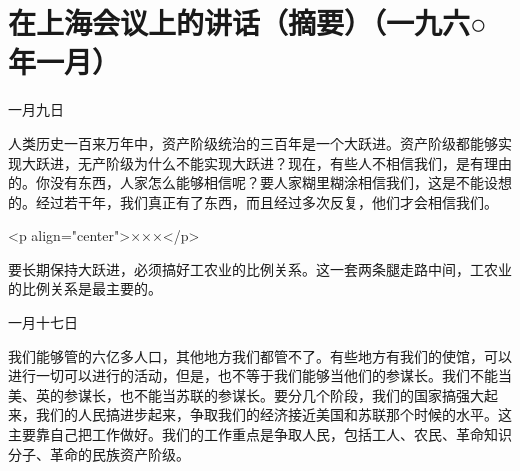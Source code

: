 \section[在上海会议上的讲话（摘要）（一九六○年一月）]{在上海会议上的讲话（摘要）（一九六○年一月）}


一月九日

人类历史一百来万年中，资产阶级统治的三百年是一个大跃进。资产阶级都能够实现大跃进，无产阶级为什么不能实现大跃进？现在，有些人不相信我们，是有理由的。你没有东西，人家怎么能够相信呢？要人家糊里糊涂相信我们，这是不能设想的。经过若干年，我们真正有了东西，而且经过多次反复，他们才会相信我们。

<p align="center">×××</p>

要长期保持大跃进，必须搞好工农业的比例关系。这一套两条腿走路中间，工农业的比例关系是最主要的。

一月十七日

我们能够管的六亿多人口，其他地方我们都管不了。有些地方有我们的使馆，可以进行一切可以进行的活动，但是，也不等于我们能够当他们的参谋长。我们不能当美、英的参谋长，也不能当苏联的参谋长。要分几个阶段，我们的国家搞强大起来，我们的人民搞进步起来，争取我们的经济接近美国和苏联那个时候的水平。这主要靠自己把工作做好。我们的工作重点是争取人民，包括工人、农民、革命知识分子、革命的民族资产阶级。



